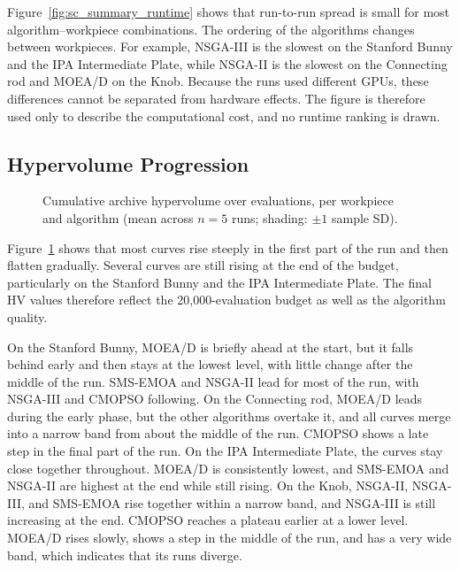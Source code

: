 Figure~\ref{fig:sc_summary_runtime} shows that run-to-run spread is small for most
algorithm--workpiece combinations. The ordering of the algorithms changes between workpieces.
For example, NSGA-III is the slowest on the Stanford Bunny and the IPA Intermediate Plate,
while NSGA-II is the slowest on the Connecting rod and MOEA/D on the Knob. Because the runs used
different GPUs, these differences cannot be separated from hardware effects. The figure is
therefore used only to describe the computational cost, and no runtime ranking is drawn.

\subsection{Hypervolume Progression}
\label{subsec:results_sc_progression}

\begin{figure}[H]
    \centering
    \caption{Cumulative archive hypervolume over evaluations, per workpiece and algorithm
    (mean across $n=5$ runs; shading: $\pm 1$ sample SD).}
    \label{fig:sc_hv_progression}
\end{figure}

Figure~\ref{fig:sc_hv_progression} shows that most curves rise steeply in the first part of
the run and then flatten gradually. Several curves are still rising at the end of the budget,
particularly on the Stanford Bunny and the IPA Intermediate Plate. The final HV values
therefore reflect the 20,000-evaluation budget as well as the algorithm quality.

On the Stanford Bunny, MOEA/D is briefly ahead at the start, but it falls behind early and
then stays at the lowest level, with little change after the middle of the run. SMS-EMOA and
NSGA-II lead for most of the run, with NSGA-III and CMOPSO following. On the Connecting rod,
MOEA/D leads during the early phase, but the other algorithms overtake it, and all curves merge
into a narrow band from about the middle of the run. CMOPSO shows a late step in the final part
of the run. On the IPA Intermediate Plate, the curves stay close together throughout. MOEA/D is
consistently lowest, and SMS-EMOA and NSGA-II are highest at the end while still rising. On the
Knob, NSGA-II, NSGA-III, and SMS-EMOA rise together within a narrow band, and NSGA-III is still
increasing at the end. CMOPSO reaches a plateau earlier at a lower level. MOEA/D rises slowly,
shows a step in the middle of the run, and has a very wide band, which indicates that its runs
diverge.

